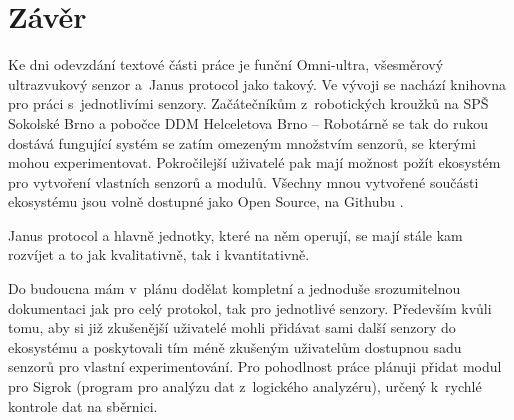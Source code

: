 \newpage
\chapter*{Závěr}

Ke dni odevzdání textové části práce je funční Omni-ultra, všesměrový ultrazvukový senzor a~Janus protocol jako takový.
Ve vývoji se nachází knihovna pro práci s~jednotlivími senzory.
Začátečníkům z~robotických kroužků na SPŠ Sokolské Brno \cite{sokolska} a pobočce DDM Helceletova Brno -- Robotárně \cite{robotarna} se tak do rukou dostává fungující systém se zatím omezeným množstvím senzorů, se kterými mohou experimentovat.
Pokročilejší uživatelé pak mají možnost požít ekosystém pro vytvoření vlastních senzorů a modulů.
Všechny mnou vytvořené součásti ekosystému jsou volně dostupné jako Open Source, na Githubu \cite{protocol}.


Janus protocol a hlavně jednotky, které na něm operují, se mají stále kam rozvíjet a to jak kvalitativně, tak i kvantitativně.

Do budoucna mám v~plánu dodělat kompletní a jednoduše srozumitelnou dokumentaci jak pro celý protokol, tak pro jednotlivé senzory.
Především kvůli tomu, aby si již zkušenější uživatelé mohli přidávat sami další senzory do ekosystému a poskytovali tím méně zkušeným uživatelům dostupnou sadu senzorů pro vlastní experimentování.
Pro pohodlnost práce plánuji přidat modul pro Sigrok (program pro analýzu dat z~logického analyzéru), určený k~rychlé kontrole dat na sběrnici.
